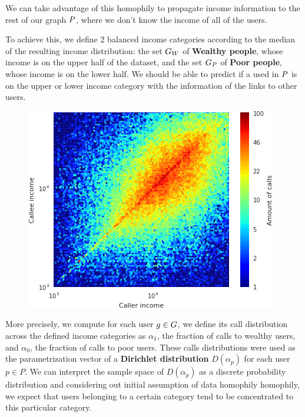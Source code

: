 We can take advantage of this homophily to propagate income information to the rest of our graph $ \mathlarger{P} $, where we don't know the income of all of the users.

To achieve this, we define 2 balanced income categories according to the median of the resulting income distribution: the set $ \mathlarger{G}_W $ of \textbf{Wealthy people}, whose income is on the upper half of the dataset, and the set $ \mathlarger{G}_P $ of \textbf{Poor people}, whose income is on the lower half. We should be able to predict if a used in $ \mathlarger{P} $ is on the upper or lower income category with the information of the links to other users.

\begin{figure}[]
\begin{center}
\includegraphics[width=1\columnwidth]{figures/Homophily_income_origin_target_1/Homophily_income_origin_target_1.png}
\caption{ \protect}
\end{center}
\end{figure}

More precisely, we compute for each user $ g \in \mathlarger{G} $, we define its call distribution across the defined income categories as $ \alpha_1 $, the fraction of calls to wealthy users, and $ \alpha_0 $, the fraction of calls to poor users. These calls distributions were used as the parametrization vector of a \textbf{Dirichlet distribution} $D(\alpha_p)$ for each user $ p \in P $. We can interpret the sample space of $ D(\alpha_p) $ as a discrete probability distribution and considering out initial assumption of data homophily homophily, we expect that users belonging to a certain category tend to be concentrated to this particular category.

